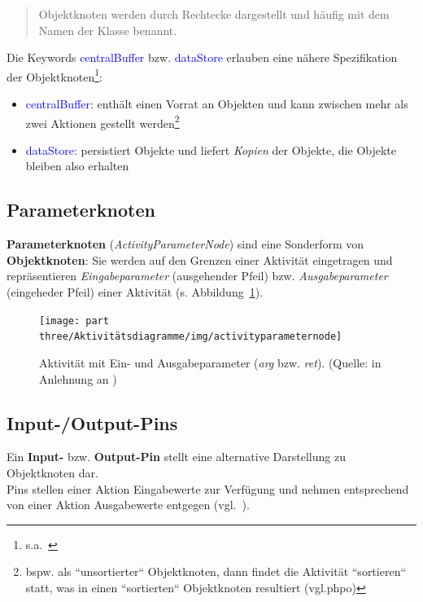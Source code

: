 \blockquote[{\cite[73]{Bal05}}]{
    Objektknoten werden durch Rechtecke dargestellt und häufig mit dem Namen der Klasse benannt.
}

\noindent
Die Keywords \textcolor{blue}{\guillemotleft centralBuffer\guillemotright} bzw. \textcolor{blue}{\guillemotleft dataStore\guillemotright} erlauben eine nähere Spezifikation der Objektknoten\footnote{s.a.~\cite[398 f.]{OMG17}}:

\begin{itemize}
    \item \textcolor{blue}{\guillemotleft centralBuffer\guillemotright}: enthält einen Vorrat an Objekten und kann zwischen mehr als zwei Aktionen gestellt werden\footnote{
    bspw. als ``unsortierter`` Objektknoten, dann findet die Aktivität ``sortieren`` statt, was in einen ``sortierten`` Objektknoten resultiert (vgl.\cite[Abb. 6.6, 62]{Buh09}phpo)
    }
    \item \textcolor{blue}{\guillemotleft dataStore\guillemotright}: persistiert Objekte und liefert \textit{Kopien} der Objekte, die Objekte bleiben also erhalten
\end{itemize}


\subsection{Parameterknoten}
\textbf{Parameterknoten} (\textit{ActivityParameterNode}) sind eine Sonderform von \textbf{Objektknoten}: Sie werden auf den Grenzen einer Aktivität eingetragen und repräsentieren \textit{Eingabeparameter} (ausgehender Pfeil) bzw. \textit{Ausgabeparameter} (eingeheder Pfeil) einer Aktivität (s. Abbildung~\ref{fig:activityparameternode}).




\begin{figure}
    \centering
    \texttt{[image: part three/Aktivitätsdiagramme/img/activityparameternode]}
    \caption{Aktivität  mit Ein- und Ausgabeparameter (\textit{arg} bzw. \textit{ret}). (Quelle: in Anlehnung an \cite[Abb.2.9-2, 70]{Bal05})}
    \label{fig:activityparameternode}
\end{figure}


\subsection{Input-/Output-Pins}
Ein \textbf{Input-} bzw. \textbf{Output-Pin} stellt eine alternative Darstellung zu Objektknoten dar.\\
Pins stellen einer Aktion Eingabewerte zur Verfügung und nehmen entsprechend von einer Aktion Ausgabewerte entgegen (vgl.~\cite[73 f.]{Bal05}).

